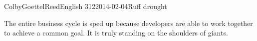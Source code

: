 \documentclass[12pt]{article}
\begin{document}
\begin{mla}{Colby}{Goettel}{Reed}{English 312}{2014-02-04}{Ruff drought}






The entire business cycle is sped up because developers are able to work together to achieve a common goal. It is truly standing on the shoulders of giants.

\end{mla}
\end{document}
